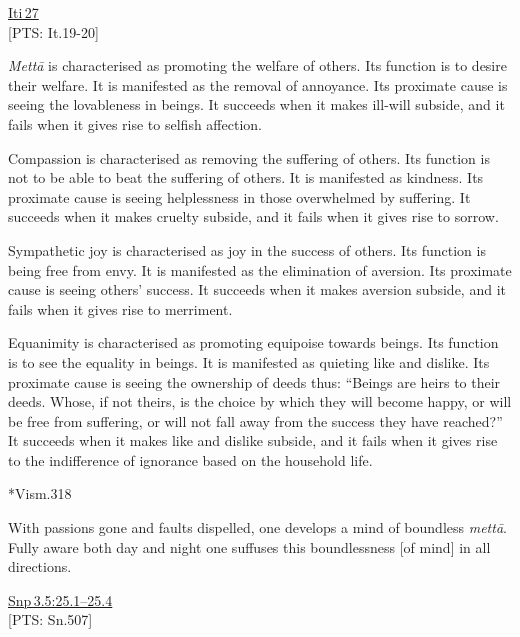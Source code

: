 \documentclass[10pt, openright]{book}
\begin{document}
\begin{flushright}
\href{https://suttacentral.net/iti27/en/sujato}{Iti 27}\\

[PTS: It.19-20]


\end{flushright}
\textit{Mettā} is characterised as promoting the welfare of others. Its function is to desire their welfare. It is manifested as the removal of annoyance. Its proximate cause is seeing the lovableness in beings. It succeeds when it makes ill-will subside, and it fails when it gives rise to selfish affection.


Compassion is characterised as removing the suffering of others. Its function is not to be able to beat the suffering of others. It is manifested as kindness. Its proximate cause is seeing helplessness in those overwhelmed by suffering. It succeeds when it makes cruelty subside, and it fails when it gives rise to sorrow.


Sympathetic joy is characterised as joy in the success of others. Its function is being free from envy. It is manifested as the elimination of aversion. Its proximate cause is seeing others’ success. It succeeds when it makes aversion subside, and it fails when it gives rise to merriment.


Equanimity is characterised as promoting equipoise towards beings. Its function is to see the equality in beings. It is manifested as quieting like and dislike. Its proximate cause is seeing the ownership of deeds thus: “Beings are heirs to their deeds. Whose, if not theirs, is the choice by which they will become happy, or will be free from suffering, or will not fall away from the success they have reached?” It succeeds when it makes like and dislike subside, and it fails when it gives rise to the indifference of ignorance based on the household life.


\begin{flushright}
*Vism.318


\end{flushright}
With passions gone and faults dispelled, one develops a mind of boundless \textit{mettā}. Fully aware both day and night one suffuses this boundlessness [of mind] in all directions.


\begin{flushright}
\href{https://suttacentral.net/snp3.5/en/sujato\#25.1}{Snp 3.5:25.1–25.4}\\

[PTS: Sn.507]


\end{flushright}
\end{document}
